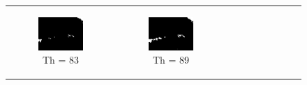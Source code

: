 \begin{figure}[htbp]
\begin{tabular}{cccc}
\begin{subfigure}{0.2\linewidth}
    \includegraphics[width=\linewidth]{plots/thresholding/th4}
    \caption{Th = 83}
    \end{subfigure} &
    \begin{subfigure}{0.2\linewidth}
    \centering
    \includegraphics[width=\linewidth]{plots/thresholding/th5}
    \caption{Th = 89}
    \end{subfigure} &
    \begin{subfigure}{0.2\linewidth}
    \centering

\end{subfigure}
\end{tabular}
\end{figure}
